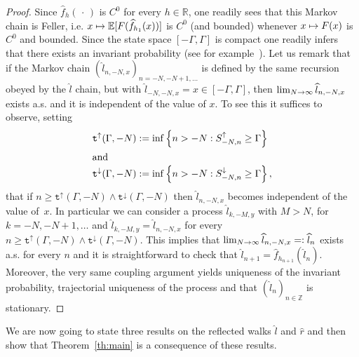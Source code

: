 \documentclass[10pt]{amsart}
\theoremstyle{definition}\newtheorem{defi}[theo]{Definition}\newtheorem{rema}[theo]{Remark}\newtheorem{exam}[theo]{Example}\newtheorem{exem}[theo]{Example}\newtheorem{nota}[theo]{Notation}
\newcommand{\bbE}{\mathbb{E}}
\newcommand{\bbR}{\mathbb{R}}
\newcommand{\bbZ}{\mathbb{Z}}
\newcommand{\gG}{\Gamma}
\newcommand{\ttt}{\mathtt{t}}
\newcommand{\ttdown}{\ttt^\downarrow}
\newcommand{\ttup}{\ttt^\uparrow}
\newcommand{\ls}{\widehat{l}}
\newcommand{\rs}{\widehat{r}}
\renewcommand*{\to}{\mathchoice{\longrightarrow}{\rightarrow}{\rightarrow}{\rightarrow}}
\let\oldmapsto\mapsto
\renewcommand*{\mapsto}{\mathchoice{\longmapsto}{\oldmapsto}{\oldmapsto}{\oldmapsto}}
\begin{document}
\begin{proof}
Since $\widehat f_h(\,\cdot\,)$ is $C^0$ for every $h\in \bbR$, one readily sees that this Markov chain is Feller, i.e. $x \mapsto \bbE[F(\widehat f_{h_1}(x))]$ is $C^0$ (and bounded) whenever $x \mapsto F(x)$ is $C^0$ and bounded. Since the state space $[-\gG, \gG]$ is compact one readily infers that there exists an invariant probability (see for example~\cite[Section~12.3]{cf:MC}). Let us remark that if the Markov chain $(\ls_{n,-N,x})_{n=-N, -N+1, \dots}$ is defined by the same recursion obeyed by the $\ls$ chain, but with $\ls_{-N,-N,x}= x \in [-\gG,\gG]$, then $\lim_{N \to \infty} \ls_{n,-N,x}$ exists a.s. and it is independent of the value of $x$. To see this it suffices to observe, setting
\begin{align}
\ttup(\gG,-N) &:= \inf\left\{n> -N: S^\uparrow_{-N, n}\ge\gG\right\}\\
\intertext{and}
\ttdown(\gG, -N) &:= \inf\left\{n> -N: S^\downarrow_{-N, n}\ge \gG\right\},
\end{align}
that if $n\ge \ttup(\gG,-N) \wedge \ttdown(\gG, -N)$ then $\ls_{n,-N,x}$ becomes independent of the value of~$x$. In particular we can consider a process $\ls_{k, -M,y}$ with $M>N$, for $k=-N,-N+1, \dots$ and $\ls_{k,-M,y}=\ls_{n, -N,x}$ for every $n\ge \ttup(\gG,-N) \wedge \ttdown(\gG, -N)$. This implies that $\lim_{N \to \infty}\ls_{n, -N,x}=: \ls _n$ exists a.s. for every $n$ and it is straightforward to check that $\ls_{n+1}= \widehat f_{h_{n+1}}(\ls_n)$. Moreover, the very same coupling argument yields uniqueness of the invariant probability, trajectorial uniqueness of the process and that $(\ls_n)_{n \in \bbZ}$ is stationary.
\end{proof}


We are now going to state three results on the reflected walks $\ls$ and $\rs$ and then show that Theorem~\ref{th:main} is a consequence of these results.
\end{document}
